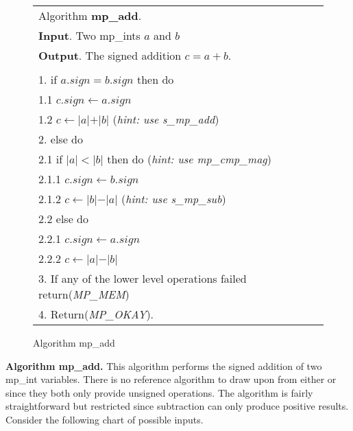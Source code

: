 \documentclass[b5paper]{book}
\begin{document}
\newpage\begin{figure}[!here]
\begin{center}
\begin{tabular}{l}
\hline Algorithm \textbf{mp\_add}. \\
\textbf{Input}.   Two mp\_ints $a$ and $b$  \\
\textbf{Output}.  The signed addition $c = a + b$. \\
\hline \\
1.  if $a.sign = b.sign$ then do \\
\hspace{3mm}1.1  $c.sign \leftarrow a.sign$  \\
\hspace{3mm}1.2  $c \leftarrow \vert a \vert + \vert b \vert$ (\textit{hint: use s\_mp\_add})\\
2.  else do \\
\hspace{3mm}2.1  if $\vert a \vert < \vert b \vert$ then do (\textit{hint: use mp\_cmp\_mag})  \\
\hspace{6mm}2.1.1  $c.sign \leftarrow b.sign$ \\
\hspace{6mm}2.1.2  $c \leftarrow \vert b \vert - \vert a \vert$ (\textit{hint: use s\_mp\_sub}) \\
\hspace{3mm}2.2  else do \\
\hspace{6mm}2.2.1  $c.sign \leftarrow a.sign$ \\
\hspace{6mm}2.2.2  $c \leftarrow \vert a \vert - \vert b \vert$ \\
3.  If any of the lower level operations failed return(\textit{MP\_MEM}) \\
4.  Return(\textit{MP\_OKAY}). \\
\hline
\end{tabular}
\end{center}
\caption{Algorithm mp\_add}
\end{figure}

\textbf{Algorithm mp\_add.}
This algorithm performs the signed addition of two mp\_int variables.  There is no reference algorithm to draw upon from either \cite{TAOCPV2} or 
\cite{HAC} since they both only provide unsigned operations.  The algorithm is fairly straightforward but restricted since subtraction can only 
produce positive results.  Consider the following chart of possible inputs.
\end{document}
